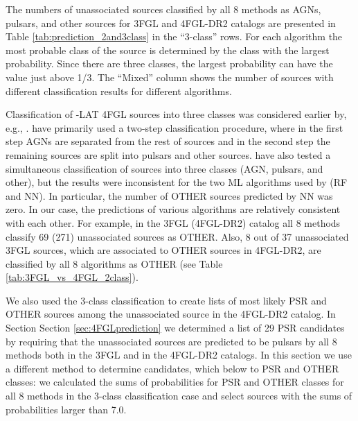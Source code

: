 The numbers of unassociated sources classified by all 8 methods as AGNs, pulsars, and other sources for 3FGL and 4FGL-DR2 catalogs are presented in Table \ref{tab:prediction_2and3class} in the ``3-class'' rows.
For each algorithm the most probable class of the source is determined by the class with the largest probability.
Since there are three classes, the largest probability can have the value just above 1/3.
The ``Mixed'' column shows the number of sources with different classification results for different algorithms.


Classification of \Fermi-LAT 4FGL sources into three classes was considered earlier by, e.g., \cite{2021RAA....21...15Z}.
\cite{2021RAA....21...15Z} have primarily used a two-step classification procedure, where in the first step AGNs are separated from the rest of sources and in the second step the remaining sources are split into pulsars and other sources.
\cite{2021RAA....21...15Z} have also tested a simultaneous classification of sources into three classes (AGN, pulsars, and other),
but the results were inconsistent for the two ML algorithms used by \cite{2021RAA....21...15Z} (RF and NN).
In particular, the number of OTHER sources predicted by NN was zero.
In our case, the predictions of various algorithms are relatively consistent with each other.
For example, in the 3FGL (4FGL-DR2) catalog all 8 methods classify 69 (271) unassociated sources as OTHER.
Also, 8 out of 37 unassociated 3FGL sources, which are associated to OTHER sources in 4FGL-DR2, are classified by all 8 algorithms as
OTHER (see Table \ref{tab:3FGL_vs_4FGL_2class}).

We also used the 3-class classification to create lists of most likely PSR and OTHER sources among the unassociated
source in the 4FGL-DR2 catalog.
In Section Section \ref{sec:4FGLprediction} we determined a list of 29 PSR candidates by requiring that 
the unassociated sources are predicted to be pulsars by all 8 methods both in the 3FGL and in the 4FGL-DR2 catalogs.
In this section we use a different method to determine candidates, which below to PSR and OTHER classes: 
we calculated the sums of probabilities for PSR and OTHER classes for all 8 methods in the 3-class classification case
and select sources with the sums of probabilities larger than 7.0.


